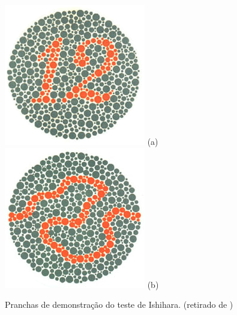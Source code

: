 \documentclass[	12pt, Times, openright, twoside, a4paper, english, brazil]{abntex2}
\begin{document}
\begin{apendicesenv}
\begin{figure}[!htb]
\centering
{\includegraphics[width=\linewidth]{ishihara-exemplos/plate1.png}}
(a)
\endminipage\hfill
{}
\centering
{\includegraphics[width=\linewidth]{ishihara-exemplos/plate38.png}}
(b)
\endminipage\hfill
\caption{Pranchas de demonstração do teste de Ishihara. (retirado de )}
\label{fig:apendiceExample}
\end{figure}


\end{apendicesenv}
\end{document}
